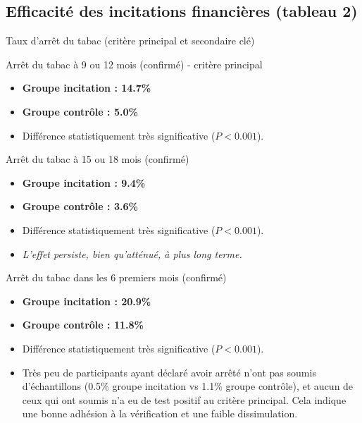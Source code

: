 \documentclass[aspectratio=169,xcolor=dvipsnames]{beamer}
\begin{document}
\subsection{Efficacité des incitations financières (tableau 2)}

\begin{frame}{Taux d'arrêt du tabac (critère principal et secondaire clé)}
    \begin{block}{Arrêt du tabac à 9 ou 12 mois (confirmé) - critère principal}
        \begin{itemize}
            \item \textbf{Groupe incitation : 14.7\%}
            \item \textbf{Groupe contrôle : 5.0\%}
            \item Différence statistiquement très significative ($P<0.001$).
        \end{itemize}
    \end{block}
    \pause
    \begin{alertblock}{Arrêt du tabac à 15 ou 18 mois (confirmé)}
        \begin{itemize}
            \item \textbf{Groupe incitation : 9.4\%}
            \item \textbf{Groupe contrôle : 3.6\%}
            \item Différence statistiquement très significative ($P<0.001$).
            \item \textit{L'effet persiste, bien qu'atténué, à plus long terme.}
        \end{itemize}
    \end{alertblock}
    \pause
    \begin{block}{Arrêt du tabac dans les 6 premiers mois (confirmé)}
        \begin{itemize}
            \item \textbf{Groupe incitation : 20.9\%}
            \item \textbf{Groupe contrôle : 11.8\%}
            \item Différence statistiquement très significative ($P<0.001$).
        \end{itemize}
    \end{block}
    \begin{itemize}
        \item Très peu de participants ayant déclaré avoir arrêté n'ont pas soumis d'échantillons (0.5\% groupe incitation vs 1.1\% groupe contrôle), et aucun de ceux qui ont soumis n'a eu de test positif au critère principal. Cela indique une bonne adhésion à la vérification et une faible dissimulation.
    \end{itemize}
\end{frame}
\end{document}
